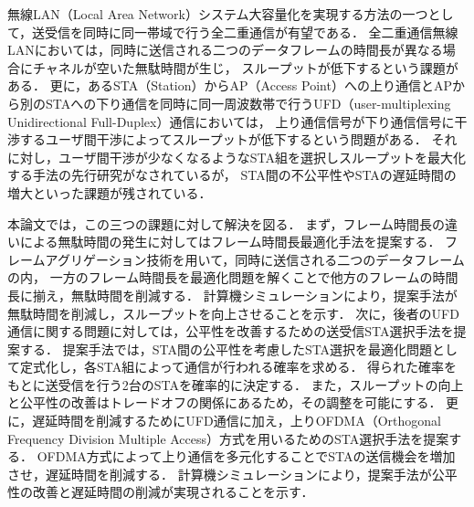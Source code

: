 \documentclass[master]{kuisthesis}		%
\date{平成29年2月8日}				%
\begin{document}
\maketitle					%

\begin{jabstract}				%
	無線LAN（Local Area Network）システム大容量化を実現する方法の一つとして，送受信を同時に同一帯域で行う全二重通信が有望である．
	全二重通信無線LANにおいては，同時に送信される二つのデータフレームの時間長が異なる場合にチャネルが空いた無駄時間が生じ，
	スループットが低下するという課題がある．
	更に，あるSTA（Station）からAP（Access Point）への上り通信とAPから別のSTAへの下り通信を同時に同一周波数帯で行うUFD（user-multiplexing Unidirectional Full-Duplex）通信においては，
	上り通信信号が下り通信信号に干渉するユーザ間干渉によってスループットが低下するという問題がある．
	それに対し，ユーザ間干渉が少なくなるようなSTA組を選択しスループットを最大化する手法の先行研究がなされているが，
	STA間の不公平性やSTAの遅延時間の増大といった課題が残されている．
	\par
	本論文では，この三つの課題に対して解決を図る．
	まず，フレーム時間長の違いによる無駄時間の発生に対してはフレーム時間長最適化手法を提案する．
	フレームアグリゲーション技術を用いて，同時に送信される二つのデータフレームの内，
	一方のフレーム時間長を最適化問題を解くことで他方のフレームの時間長に揃え，無駄時間を削減する．
	計算機シミュレーションにより，提案手法が無駄時間を削減し，スループットを向上させることを示す．
	次に，後者のUFD通信に関する問題に対しては，公平性を改善するための送受信STA選択手法を提案する．
	提案手法では，STA間の公平性を考慮したSTA選択を最適化問題として定式化し，各STA組によって通信が行われる確率を求める．
	得られた確率をもとに送受信を行う2台のSTAを確率的に決定する．
	また，スループットの向上と公平性の改善はトレードオフの関係にあるため，その調整を可能にする．
	更に，遅延時間を削減するためにUFD通信に加え，上りOFDMA（Orthogonal Frequency Division Multiple Access）方式を用いるためのSTA選択手法を提案する．
	OFDMA方式によって上り通信を多元化することでSTAの送信機会を増加させ，遅延時間を削減する．
	計算機シミュレーションにより，提案手法が公平性の改善と遅延時間の削減が実現されることを示す．
\end{jabstract}
\end{document}
